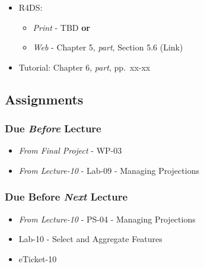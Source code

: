 \documentclass[]{book}
\providecommand{\tightlist}{%
  \setlength{\itemsep}{0pt}\setlength{\parskip}{0pt}}
\begin{document}
\begin{itemize}
\tightlist
\item
  R4DS:

  \begin{itemize}
  \tightlist
  \item
    \emph{Print} - TBD \textbf{or}
  \item
    \emph{Web} - Chapter 5, \emph{part}, Section 5.6 (Link)
  \end{itemize}
\item
  Tutorial: Chapter 6, \emph{part}, pp.~xx-xx
\end{itemize}

\hypertarget{assignments-12}{%
\subsection*{Assignments}\label{assignments-12}}

\hypertarget{due-before-lecture-10}{%
\subsubsection*{\texorpdfstring{Due \emph{Before} Lecture}{Due Before Lecture}}\label{due-before-lecture-10}}

\begin{itemize}
\tightlist
\item
  \emph{From Final Project} - WP-03
\item
  \emph{From Lecture-10} - Lab-09 - Managing Projections
\end{itemize}

\hypertarget{due-before-next-lecture-9}{%
\subsubsection*{\texorpdfstring{Due Before \emph{Next} Lecture}{Due Before Next Lecture}}\label{due-before-next-lecture-9}}

\begin{itemize}
\tightlist
\item
  \emph{From Lecture-10} - PS-04 - Managing Projections
\item
  Lab-10 - Select and Aggregate Features
\item
  eTicket-10
\end{itemize}
\end{document}
